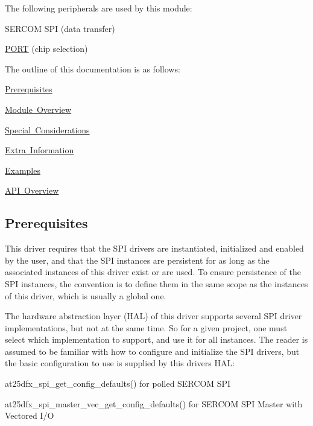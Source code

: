 The following peripherals are used by this module\+:
\begin{DoxyItemize}
\item S\+E\+R\+C\+OM S\+PI (data transfer)
\item \mbox{\hyperlink{group___s_a_m_d21_j18_a__base_ga614217d263be1fb1a5f76e2ff7be19a2}{P\+O\+RT}} (chip selection)
\end{DoxyItemize}

The outline of this documentation is as follows\+:
\begin{DoxyItemize}
\item \mbox{\hyperlink{group__asfdoc__common2__at25dfx__group_asfdoc_common2_at25dfx_prerequisites}{Prerequisites}}
\item \mbox{\hyperlink{group__asfdoc__common2__at25dfx__group_asfdoc_common2_at25dfx_module_overview}{Module Overview}}
\item \mbox{\hyperlink{group__asfdoc__common2__at25dfx__group_asfdoc_common2_at25dfx_special_considerations}{Special Considerations}}
\item \mbox{\hyperlink{group__asfdoc__common2__at25dfx__group_asfdoc_common2_at25dfx_extra_info}{Extra Information}}
\item \mbox{\hyperlink{group__asfdoc__common2__at25dfx__group_asfdoc_common2_at25dfx_examples}{Examples}}
\item \mbox{\hyperlink{group__asfdoc__common2__at25dfx__group_asfdoc_common2_at25dfx_api_overview}{A\+PI Overview}}
\end{DoxyItemize}\hypertarget{group__asfdoc__common2__at25dfx__group_asfdoc_common2_at25dfx_prerequisites}{}\subsection{Prerequisites}\label{group__asfdoc__common2__at25dfx__group_asfdoc_common2_at25dfx_prerequisites}
This driver requires that the S\+PI drivers are instantiated, initialized and enabled by the user, and that the S\+PI instances are persistent for as long as the associated instances of this driver exist or are used. To ensure persistence of the S\+PI instances, the convention is to define them in the same scope as the instances of this driver, which is usually a global one.

The hardware abstraction layer (H\+AL) of this driver supports several S\+PI driver implementations, but not at the same time. So for a given project, one must select which implementation to support, and use it for all instances. The reader is assumed to be familiar with how to configure and initialize the S\+PI drivers, but the basic configuration to use is supplied by this driver\textquotesingle{}s H\+AL\+:
\begin{DoxyItemize}
\item at25dfx\+\_\+spi\+\_\+get\+\_\+config\+\_\+defaults() for polled S\+E\+R\+C\+OM S\+PI
\item at25dfx\+\_\+spi\+\_\+master\+\_\+vec\+\_\+get\+\_\+config\+\_\+defaults() for S\+E\+R\+C\+OM S\+PI Master with Vectored I/O
\end{DoxyItemize}

